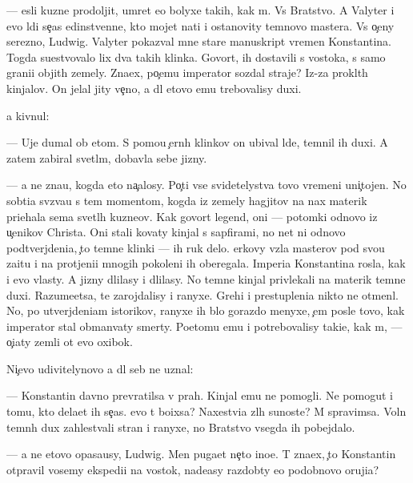 \documentclass[10pt]{book}
\begin{document}
— {\Y}esli kuzne{\q} prodoljit, umret {\y}e{\x}o bolyxe takih, kak m{\yi}. Vs{\e} Bratstvo. A Valyter i {\y}evo l{\iu}di se{\y}{\c}as {\y}edinstvenn{\yi}{\y}e, kto mojet na{\y}ti i ostanovity temnovo mastera. Vs{\e} o{\c}eny ser{\y}ezno, Ludwig. Valyter pokaz{\yi}val mne star{\yi}{\y}e manuskript{\yi} vremen Konstantina. Togda su{\x}estvovalo lix dva takih klinka. Govor{\ia}t, ih dostavili s vostoka, s samo{\y} grani{\q}i objit{\yi}h zemely. Zna{\y}ex, po{\c}emu imperator sozdal straje{\y}? Iz-za prokl{\ia}t{\yi}h kinjalov. On jelal jity ve{\c}no, a dl{\ia} etovo {\y}emu trebovalisy duxi.

{\Y}a kivnul:

— Uje dumal ob etom. S pomo{\x}{\y}u {\c}ern{\yi}h klinkov on ubival l{\iu}de{\y}, temnil ih duxi. A zatem zabiral svetl{\yi}m, dobavl{\ia}{\y}a sebe jizny.

— {\Y}a ne zna{\y}u, kogda eto na{\c}alosy. Po{\c}ti vse svidetelystva tovo vremeni uni{\c}tojen{\yi}. No sob{\yi}ti{\y}a sv{\ia}z{\yi}va{\y}u s tem momentom, kogda iz zemely hagjitov na nax materik pri{\y}ehala sem{\y}a svetl{\yi}h kuzne{\q}ov. Kak govor{\ia}t legend{\yi}, oni — potomki odnovo iz u{\c}enikov Christa. Oni stali kovaty kinjal{\yi} s sapfirami, no net ni odnovo podtverjdeni{\y}a, {\c}to temn{\yi}{\y}e klinki — ih ruk delo. {\Q}erkovy vz{\ia}la masterov pod svo{\y}u za{\x}itu i na prot{\ia}jeni{\y}i mnogih pokoleni{\y} ih oberegala. Imperi{\y}a Konstantina rosla, kak i {\y}evo vlasty. A jizny dlilasy i dlilasy. No temn{\yi}{\y}e kinjal{\yi} privlekali na materik temn{\yi}{\y}e duxi. Razume{\y}etsa, te zarojdalisy i ranyxe. Grehi i prestupleni{\y}a nikto ne otmen{\ia}l. No, po utverjdeni{\y}am istorikov, ranyxe ih b{\yi}lo gorazdo menyxe, {\c}em posle tovo, kak imperator stal obman{\yi}vaty smerty. Poetomu {\y}emu i potrebovalisy taki{\y}e, kak m{\yi}, — o{\c}i{\x}aty zemli ot {\y}evo oxibok.

Ni{\c}evo udivitelynovo {\y}a dl{\ia} seb{\ia} ne uznal:

— Konstantin davno prevratilsa v prah. Kinjal{\yi} {\y}emu ne pomogli. Ne pomogut i tomu, kto dela{\y}et ih se{\y}{\c}as. {\C}evo t{\yi} bo{\y}ixsa? Naxestvi{\y}a zl{\yi}h su{\x}noste{\y}? M{\yi} spravimsa. Voln{\yi} temn{\yi}h dux zahlest{\yi}vali stran{\yi} i ranyxe, no Bratstvo vsegda ih pobejdalo.

— {\Y}a ne etovo opasa{\y}usy, Ludwig. Men{\ia} puga{\y}et ne{\c}to ino{\y}e. T{\yi} zna{\y}ex, {\c}to Konstantin otpravil vosemy ekspedi{\q}i{\y} na vostok, nade{\y}asy razdob{\yi}ty {\y}e{\x}o podobnovo oruji{\y}a?
\end{document}
